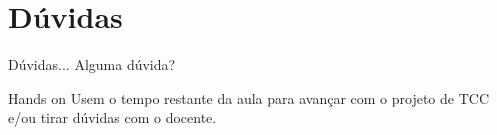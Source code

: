 \section{Dúvidas}

\begin{frame}
	\begin{block}{Dúvidas...}
		Alguma dúvida?
	\end{block}
\end{frame}

\begin{frame}
	\begin{block}{Hands on}
		Usem o tempo restante da aula para avançar com o projeto de TCC e/ou tirar dúvidas com o docente.
	\end{block}
\end{frame}